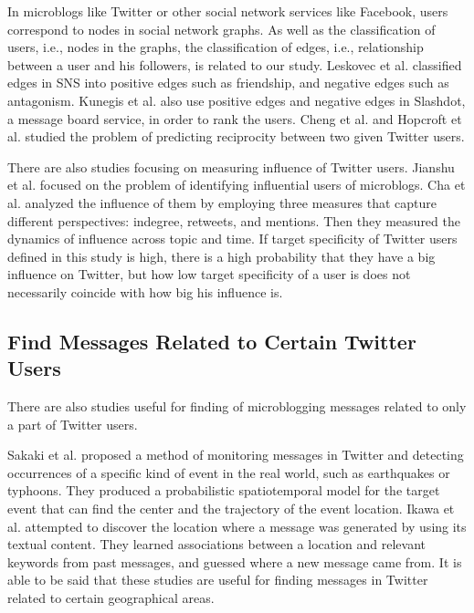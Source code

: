 In microblogs like Twitter or other social network services
like Facebook, users correspond to nodes in social network graphs. As
well as the classification of users, i.e., nodes in the graphs, the
classification of edges, i.e., relationship between a user and his
followers, is related to our study. Leskovec et
al.\cite{leskovec2010predicting,leskovec2010signed} classified edges in
SNS into positive edges such as friendship, and negative edges such as
antagonism. Kunegis et al.\cite{kunegis2009slashdot} also use positive
edges and negative edges in Slashdot, a message board service, in order
to rank the users. Cheng et al.\cite{cheng2011predicting} and Hopcroft
et al.\cite{hopcroft2011will} studied the problem of predicting
reciprocity between two given Twitter users.

There are also studies focusing on measuring influence of Twitter
users.  Jianshu et al.\cite{weng2010twitterrank} focused on the problem of
identifying influential users of microblogs.  Cha et
al.\cite{cha2010measuring} analyzed the influence of them
by employing three measures that capture different perspectives:
indegree, retweets, and mentions.  Then they measured the dynamics of
influence across topic and time.  If target specificity of Twitter users
defined in this study is high, there is a high probability that they
have a big influence on Twitter, but how low target specificity of a
user is does not necessarily coincide with how big his influence is.

\subsection{Find Messages Related to Certain Twitter Users}
\label{subsec:Some User}

There are also studies useful for finding of microblogging messages
related to only a part of Twitter users.

Sakaki et al.\cite{sakaki2010earthquake} proposed a method of monitoring
messages in Twitter and detecting occurrences of a specific kind of event
in the real world, such as earthquakes or typhoons.  They produced a
probabilistic spatiotemporal model for the target event that can find
the center and the trajectory of the event location.  Ikawa et
al.\cite{ikawa2012location} attempted to discover the location where a
message was generated by using its textual content.  They learned
associations between a location and relevant keywords from past
messages, and guessed where a new message came from.  It is able to be
said that these studies are useful for finding messages in Twitter
related to certain geographical areas.

